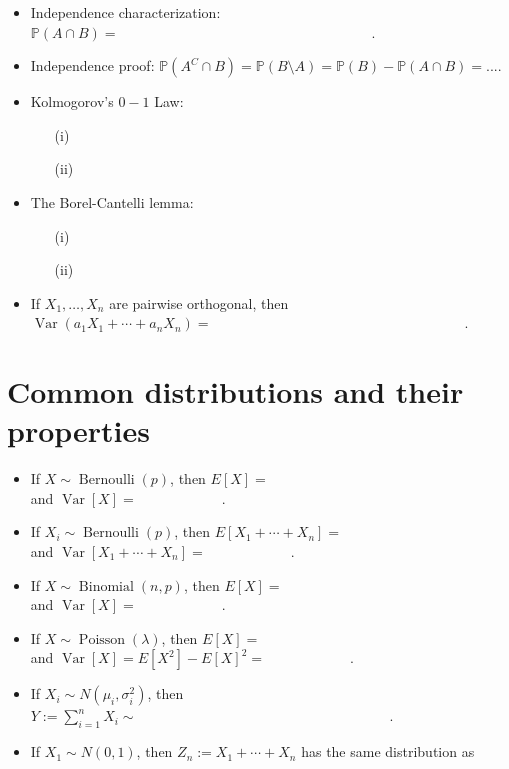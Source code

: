 \documentclass[12pt,reqno]{article}
\theoremstyle{plain}
\theoremstyle{definition}
\newcommand{\PP}[1]{\ensuremath{\mathbb{P}\left(#1\right)}}
\begin{document}
\begin{itemize} 

\item Independence characterization: $\PP{A \cap B} = \hspace{3in}$. 
\item Independence proof: $\PP{A^{C} \cap B} = \PP{B \setminus A} = \PP{B} - \PP{A \cap B} = ...$. 
\item Kolmogorov's $0-1$ Law: 
      \begin{itemize} 
      \item[(i)] 
      \item[(ii)] 
      \end{itemize} 
\item The Borel-Cantelli lemma: 
      \begin{itemize} 
      \item[(i)] 
      \item[(ii)] 
      \end{itemize} 
\item If $X_1,\ldots,X_n$ are pairwise orthogonal, then \\ 
      $\operatorname{Var}(a_1X_1+\cdots+a_nX_n) = \hspace{3in}$. 
      
\end{itemize} 

\section{Common distributions and their properties} 

\begin{itemize} 

\item If $X \sim \operatorname{Bernoulli}(p)$, then $E[X] = \hspace{1in}$ \\ and 
      $\operatorname{Var}[X] = \hspace{1in}$. 
\item If $X_i \sim \operatorname{Bernoulli}(p)$, then $E[X_1+\cdots+X_n] = \hspace{1in}$ \\ and 
      $\operatorname{Var}[X_1+\cdots+X_n] = \hspace{1in}$. 
\item If $X \sim \operatorname{Binomial}(n, p)$, then $E[X] = \hspace{1in}$ \\ and 
      $\operatorname{Var}[X] = \hspace{1in}$. 
\item If $X \sim \operatorname{Poisson}(\lambda)$, then $E[X] = \hspace{1in}$ \\ and 
      $\operatorname{Var}[X] = E[X^2] - E[X]^2 = \hspace{1in}$. 
\item If $X_i \sim N(\mu_i, \sigma_i^2)$, then $Y := \sum_{i=1}^n X_i \sim \hspace{3in}$. 
\item If $X_1 \sim N(0, 1)$, then $Z_n := X_1+\cdots+X_n$ has the same distribution as 

\end{itemize} 
\end{document}

